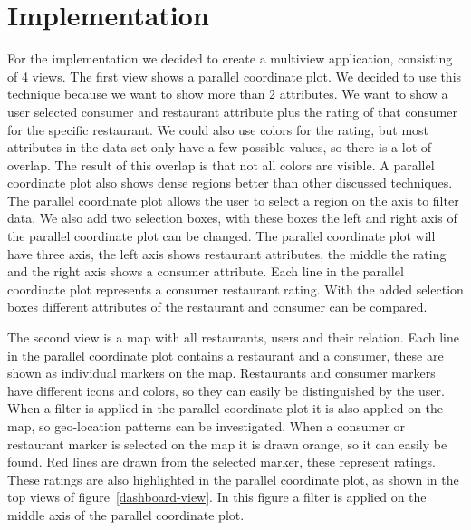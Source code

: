 \section{Implementation}\label{sec:implemenation}

For the implementation we decided to create a multiview application, consisting of 4 views.
The first view shows a parallel coordinate plot.
We decided to use this technique because we want to show more than 2 attributes.
We want to show a user selected consumer and restaurant attribute plus the rating of that consumer for the specific restaurant.
We could also use colors for the rating, but most attributes in the data set only have a few possible values, so there is a lot of overlap.
The result of this overlap is that not all colors are visible.
A parallel coordinate plot also shows dense regions better than other discussed techniques.
The parallel coordinate plot allows the user to select a region on the axis to filter data.
We also add two selection boxes, with these boxes the left and right axis of the parallel coordinate plot can be changed.
The parallel coordinate plot will have three axis, the left axis shows restaurant attributes, the middle the rating and the right axis shows a consumer attribute.
Each line in the parallel coordinate plot represents a consumer restaurant rating.
With the added selection boxes different attributes of the restaurant and consumer can be compared.

The second view is a map with all restaurants, users and their relation.
Each line in the parallel coordinate plot contains a restaurant and a consumer, these are shown as individual markers on the map.
Restaurants and consumer markers have different icons and colors, so they can easily be distinguished by the user.
When a filter is applied in the parallel coordinate plot it is also applied on the map, so geo-location patterns can be investigated.
When a consumer or restaurant marker is selected on the map it is drawn orange, so it can easily be found.
Red lines are drawn from the selected marker, these represent ratings.
These ratings are also highlighted in the parallel coordinate plot, as shown in the top views of figure~\ref{dashboard-view}.
In this figure a filter is applied on the middle axis of the parallel coordinate plot.


